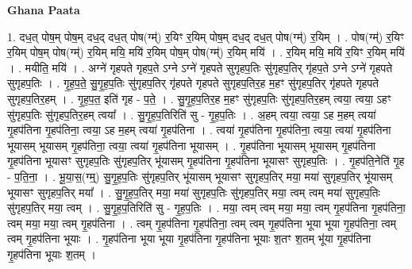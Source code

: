 \documentclass[17pt]{extarticle}
\begin{document}
\textbf{Ghana Paata } \newline

1. दध॒त् पोष॒म् पोष॒म् दध॒द् दध॒त् पोष(ग्म्॑) र॒यिꣳ र॒यिम् पोष॒म् दध॒द् दध॒त् पोष(ग्म्॑) र॒यिम् । . पोष(ग्म्॑) र॒यिꣳ र॒यिम् पोष॒म् पोष(ग्म्॑) र॒यिम् मयि॒ मयि॑ र॒यिम् पोष॒म् पोष(ग्म्॑) र॒यिम् मयि॑ । . र॒यिम् मयि॒ मयि॑ र॒यिꣳ र॒यिम् मयि॑ । . मयीति॒ मयि॑ । . अग्ने॑ गृहपते गृहप॒ते ऽग्ने ऽग्ने॑ गृहपते सुगृहप॒तिः सु॑गृहप॒तिर् गृ॑हप॒ते ऽग्ने ऽग्ने॑ गृहपते सुगृहप॒तिः । . गृ॒ह॒प॒ते॒ सु॒गृ॒ह॒प॒तिः सु॑गृहप॒तिर् गृ॑हपते गृहपते सुगृहप॒तिर॒ह म॒हꣳ सु॑गृहप॒तिर् गृ॑हपते गृहपते सुगृहप॒तिर॒हम् । . गृ॒ह॒प॒त॒ इति॑ गृह - प॒ते॒ । . सु॒गृ॒ह॒प॒तिर॒ह म॒हꣳ सु॑गृहप॒तिः सु॑गृहप॒तिर॒हम् त्वया॒ त्वया॒ ऽहꣳ सु॑गृहप॒तिः सु॑गृहप॒तिर॒हम् त्वया᳚ । . सु॒गृ॒ह॒प॒तिरिति॑ सु - गृ॒ह॒प॒तिः । . अ॒हम् त्वया॒ त्वया॒ ऽह म॒हम् त्वया॑ गृ॒हप॑तिना गृ॒हप॑तिना॒ त्वया॒ ऽह म॒हम् त्वया॑ गृ॒हप॑तिना । . त्वया॑ गृ॒हप॑तिना गृ॒हप॑तिना॒ त्वया॒ त्वया॑ गृ॒हप॑तिना भूयासम् भूयासम् गृ॒हप॑तिना॒ त्वया॒ त्वया॑ गृ॒हप॑तिना भूयासम् । . गृ॒हप॑तिना भूयासम् भूयासम् गृ॒हप॑तिना गृ॒हप॑तिना भूयासꣳ सुगृहप॒तिः सु॑गृहप॒तिर् भू॑यासम् गृ॒हप॑तिना गृ॒हप॑तिना भूयासꣳ सुगृहप॒तिः । . गृ॒हप॑ति॒नेति॑ गृ॒ह - प॒ति॒ना॒ । . भू॒या॒स॒(ग्म्॒) सु॒गृ॒ह॒प॒तिः सु॑गृहप॒तिर् भू॑यासम् भूयासꣳ सुगृहप॒तिर् मया॒ मया॑ सुगृहप॒तिर् भू॑यासम् भूयासꣳ सुगृहप॒तिर् मया᳚ । . सु॒गृ॒ह॒प॒तिर् मया॒ मया॑ सुगृहप॒तिः सु॑गृहप॒तिर् मया॒ त्वम् त्वम् मया॑ सुगृहप॒तिः सु॑गृहप॒तिर् मया॒ त्वम् । . सु॒गृ॒ह॒प॒तिरिति॑ सु - गृ॒ह॒प॒तिः । . मया॒ त्वम् त्वम् मया॒ मया॒ त्वम् गृ॒हप॑तिना गृ॒हप॑तिना॒ त्वम् मया॒ मया॒ त्वम् गृ॒हप॑तिना । . त्वम् गृ॒हप॑तिना गृ॒हप॑तिना॒ त्वम् त्वम् गृ॒हप॑तिना भूया भूया गृ॒हप॑तिना॒ त्वम् त्वम् गृ॒हप॑तिना भूयाः । . गृ॒हप॑तिना भूया भूया गृ॒हप॑तिना गृ॒हप॑तिना भूयाः श॒तꣳ श॒तम् भू॑या गृ॒हप॑तिना गृ॒हप॑तिना भूयाः श॒तम् । \newline
\end{document}

